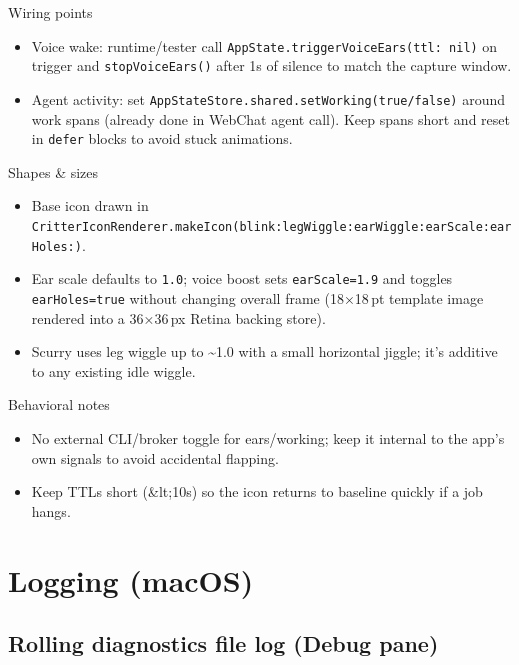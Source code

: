 Wiring points

\begin{itemize}
  \item Voice wake: runtime/tester call \texttt{AppState.triggerVoiceEars(ttl: nil)} on trigger and \texttt{stopVoiceEars()} after 1s of silence to match the capture window.
  \item Agent activity: set \texttt{AppStateStore.shared.setWorking(true/false)} around work spans (already done in WebChat agent call). Keep spans short and reset in \texttt{defer} blocks to avoid stuck animations.
\end{itemize}


Shapes \& sizes

\begin{itemize}
  \item Base icon drawn in \texttt{CritterIconRenderer.makeIcon(blink:legWiggle:earWiggle:earScale:earHoles:)}.
  \item Ear scale defaults to \texttt{1.0}; voice boost sets \texttt{earScale=1.9} and toggles \texttt{earHoles=true} without changing overall frame (18×18 pt template image rendered into a 36×36 px Retina backing store).
  \item Scurry uses leg wiggle up to \textasciitilde{}1.0 with a small horizontal jiggle; it’s additive to any existing idle wiggle.
\end{itemize}


Behavioral notes

\begin{itemize}
  \item No external CLI/broker toggle for ears/working; keep it internal to the app’s own signals to avoid accidental flapping.
  \item Keep TTLs short (\&lt;10s) so the icon returns to baseline quickly if a job hangs.
\end{itemize}



\clearpage

\section{Logging (macOS)}


\subsection{Rolling diagnostics file log (Debug pane)}


